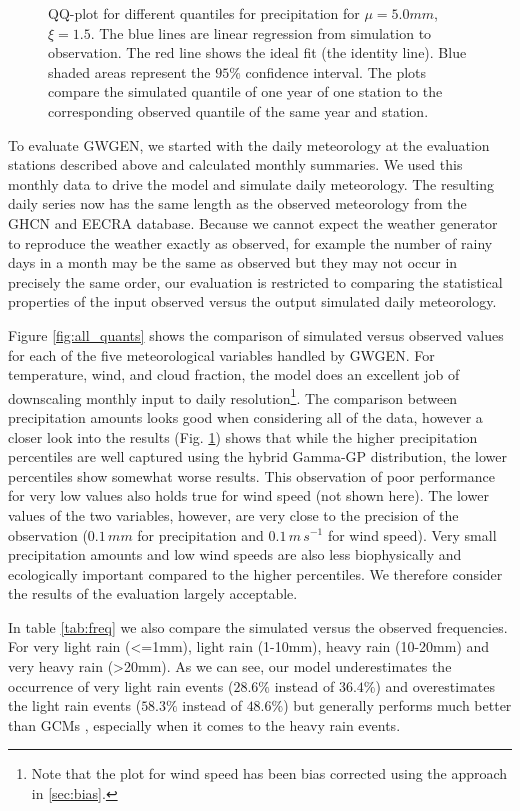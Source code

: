\begin{refsection}
\begin{figure}
	\caption[QQ-plots for different quantiles for precipitation]{QQ-plot for different quantiles for precipitation for ${\mu=5.0\unit{mm}}$, $\xi=1.5$. The blue lines are linear regression from simulation to observation. The red line shows the ideal fit (the identity line). Blue shaded areas represent the $95\%$ confidence interval. The plots compare the simulated quantile of one year of one station to the corresponding observed quantile of the same year and station. }
	\label{fig:precip_quants}
\end{figure}

To evaluate GWGEN, we started with the daily meteorology at the evaluation stations described above and calculated monthly summaries. We used this monthly data to drive the model and simulate daily meteorology. The resulting daily series now has the same length as the observed meteorology from the GHCN and EECRA database. Because we cannot expect the weather generator to reproduce the weather exactly as observed, for example the number of rainy days in a month may be the same as observed but they may not occur in precisely the same order, our evaluation is restricted to comparing the statistical properties of the input observed versus the output simulated daily meteorology.

Figure \ref{fig:all_quants} shows the comparison of simulated versus observed values for each of the five meteorological variables handled by GWGEN. For temperature, wind, and cloud fraction, the model does an excellent job of downscaling monthly input to daily resolution\footnote{Note that the plot for wind speed has been bias corrected using the approach in \autoref{sec:bias}.}. The comparison between precipitation amounts looks good when considering all of the data, however a closer look into the results (Fig. \ref{fig:precip_quants}) shows that while the higher precipitation percentiles are well captured using the hybrid Gamma-GP distribution, the lower percentiles show somewhat worse results. This observation of poor performance for very low values also holds true for wind speed (not shown here). The lower values of the two variables, however, are very close to the precision of the observation ($0.1\, \unit{mm}$ for precipitation and  $0.1\, \unit{m}\, \unit{s}^{-1}$ for wind speed). Very small precipitation amounts and low wind speeds are also less biophysically and ecologically important compared to the higher percentiles. We therefore consider the results of the evaluation largely acceptable.

In table \ref{tab:freq} we also compare the simulated versus the observed frequencies. For very light rain (<=1mm), light rain (1-10mm), heavy rain (10-20mm) and very heavy rain (>20mm). As we can see, our model underestimates the occurrence of very light rain events ($28.6\%$ instead of $36.4\%$) and overestimates the light rain events ($58.3\%$ instead of $48.6\%$) but generally performs much better than GCMs \citep{Dai2006,SunSolomonDaiEtAl2006}, especially when it comes to the heavy rain events.


\end{refsection}
